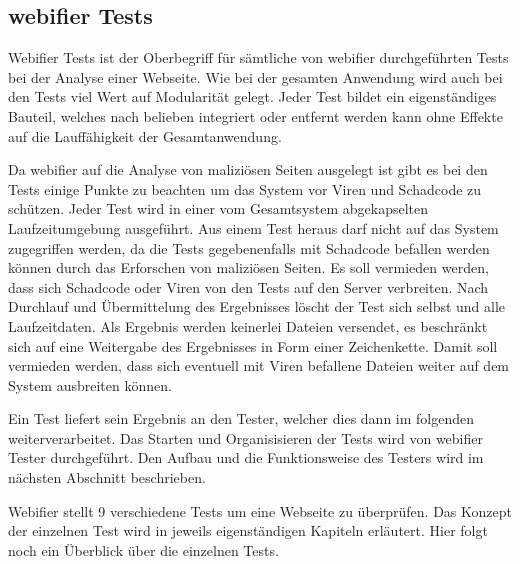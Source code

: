 \subsection{webifier Tests}
Webifier Tests ist der Oberbegriff für sämtliche von webifier durchgeführten Tests bei der Analyse einer Webseite. Wie bei der gesamten Anwendung wird auch bei den Tests viel Wert auf Modularität gelegt. Jeder Test bildet ein eigenständiges Bauteil, welches nach belieben integriert oder entfernt werden kann ohne Effekte auf die Lauffähigkeit der Gesamtanwendung.

Da webifier auf die Analyse von maliziösen Seiten ausgelegt ist gibt es bei den Tests einige Punkte zu beachten um das System vor Viren und Schadcode zu schützen.
Jeder Test wird in einer vom Gesamtsystem abgekapselten Laufzeitumgebung ausgeführt. Aus einem Test heraus darf nicht auf das System zugegriffen werden, da die Tests gegebenenfalls mit Schadcode befallen werden können durch das Erforschen von maliziösen Seiten. Es soll vermieden werden, dass sich Schadcode oder Viren von den Tests auf den Server verbreiten. Nach Durchlauf und Übermittelung des Ergebnisses löscht der Test sich selbst und alle Laufzeitdaten. Als Ergebnis werden keinerlei Dateien versendet, es beschränkt sich auf eine Weitergabe des Ergebnisses in Form einer Zeichenkette. Damit soll vermieden werden, dass sich eventuell mit Viren befallene Dateien weiter auf dem System ausbreiten können.

Ein Test liefert sein Ergebnis an den Tester, welcher dies dann im folgenden weiterverarbeitet.
Das Starten und Organisisieren der Tests wird von webifier Tester durchgeführt. Den Aufbau und die Funktionsweise des Testers wird im nächsten Abschnitt beschrieben.

Webifier stellt 9 verschiedene Tests um eine Webseite zu überprüfen. Das Konzept der einzelnen Test wird in jeweils eigenständigen Kapiteln erläutert. Hier folgt noch ein Überblick über die einzelnen Tests.

